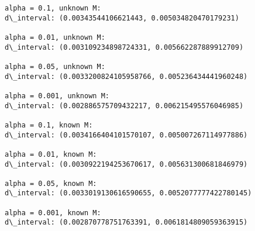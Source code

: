 \documentclass[11pt]{article}
\begin{document}
    \begin{Verbatim}[commandchars=\\\{\}]
alpha = 0.1, unknown M:
d\_interval: (0.00343544106621443, 0.005034820470179231)

alpha = 0.01, unknown M:
d\_interval: (0.003109234898724331, 0.005662287889912709)

alpha = 0.05, unknown M:
d\_interval: (0.0033200824105958766, 0.005236434441960248)

alpha = 0.001, unknown M:
d\_interval: (0.002886575709432217, 0.006215495576046985)

alpha = 0.1, known M:
d\_interval: (0.0034166404101570107, 0.005007267114977886)

alpha = 0.01, known M:
d\_interval: (0.0030922194253670617, 0.005631300681846979)

alpha = 0.05, known M:
d\_interval: (0.0033019130616590655, 0.0052077777422780145)

alpha = 0.001, known M:
d\_interval: (0.002870778751763391, 0.0061814809059363915)


    \end{Verbatim}

    \begin{center}
    \end{center}
    { \hspace*{\fill} \\}
    

    
    
    
    
\end{document}

